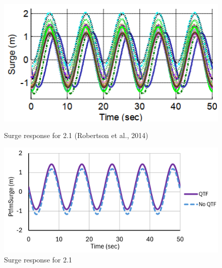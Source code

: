 \documentclass[a4paper, 11pt]{article}
\begin{document}
\begin{figure}[H]
    \begin{minipage}{0.48\textwidth}
        \centering
        \includegraphics[width=1\textwidth]{2.1_surge.png}
        \caption{\small Surge response for 2.1 (Robertson et al., 2014)}
        \label{fig:2.1_surge}
    \end{minipage}
    \hfill
    \begin{minipage}{0.51\textwidth}
        \centering
        \vspace{-0.3cm}
        \includegraphics[width=1\textwidth]{2.1_surge_mine.png}
        \caption{\small Surge response for 2.1}
        \label{fig:2.1_surge_mine}
    \end{minipage}
\end{figure}
\end{document}
